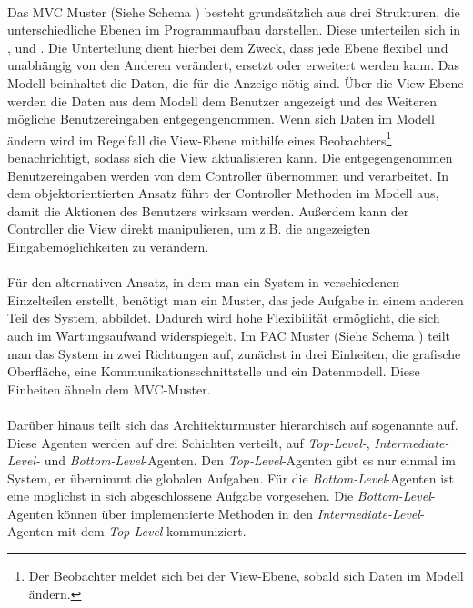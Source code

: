 \paragraph{}
Das MVC Muster (Siehe Schema ) besteht grundsätzlich aus drei Strukturen, die unterschiedliche Ebenen im Programmaufbau darstellen.
Diese unterteilen sich in ,  und . Die Unterteilung dient hierbei dem Zweck, dass jede Ebene flexibel und unabhängig von den Anderen verändert, ersetzt oder erweitert werden kann. 
Das Modell beinhaltet die Daten, die für die Anzeige nötig sind. Über die View-Ebene werden die Daten aus dem Modell dem Benutzer angezeigt und des Weiteren mögliche Benutzereingaben entgegengenommen. Wenn sich Daten im Modell ändern wird im Regelfall die View-Ebene mithilfe eines Beobachters\footnote{Der Beobachter meldet sich bei der View-Ebene, sobald sich Daten im Modell ändern.} benachrichtigt, sodass sich die View aktualisieren kann. Die entgegengenommen Benutzereingaben werden von dem Controller übernommen und verarbeitet. In dem objektorientierten Ansatz führt der Controller Methoden im Modell aus, damit die Aktionen des Benutzers wirksam werden. Außerdem kann der Controller die View direkt manipulieren, um z.B. die angezeigten Eingabemöglichkeiten zu verändern. 
\paragraph{}
Für den alternativen Ansatz, in dem man ein System in verschiedenen Einzelteilen erstellt, benötigt man ein Muster, das jede Aufgabe in einem anderen Teil des System, abbildet. Dadurch wird hohe Flexibilität ermöglicht, die sich auch im Wartungsaufwand widerspiegelt.
Im PAC Muster (Siehe Schema ) teilt man das System in zwei Richtungen auf, zunächst in drei Einheiten, die grafische Oberfläche, eine Kommunikationsschnittstelle und ein Datenmodell. Diese Einheiten ähneln dem MVC-Muster.
\paragraph{}
Darüber hinaus teilt sich das Architekturmuster hierarchisch auf sogenannte  auf.
Diese Agenten werden auf drei Schichten verteilt, auf \textit{Top-Level-}, \textit{Intermediate-Level-} und \textit{Bottom-Level}-Agenten. Den \textit{Top-Level}-Agenten gibt es nur einmal im System, er übernimmt die globalen Aufgaben. Für die \textit{Bottom-Level}-Agenten ist eine möglichst in sich abgeschlossene Aufgabe vorgesehen. Die \textit{Bottom-Level}-Agenten können über implementierte Methoden in den \textit{Intermediate-Level}-Agenten mit dem \textit{Top-Level} kommuniziert.
